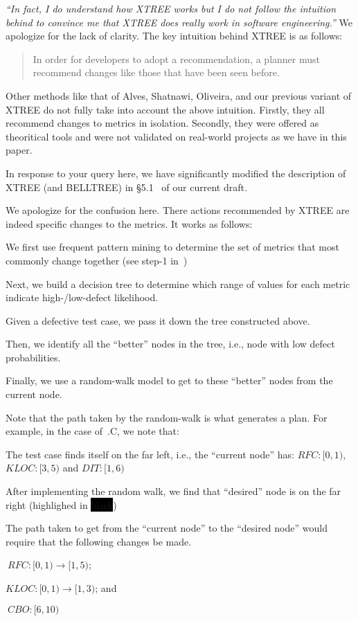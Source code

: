 \item \textit{``In fact, I do understand how XTREE works but I do not follow the intuition behind to convince me that XTREE does really work in software engineering.''} We apologize for the lack of clarity. The key intuition behind XTREE is as follows: 
\begin{quote}
   In order for developers to adopt a recommendation, a planner must recommend changes like those that have been seen before. 
\end{quote}
Other methods like that of Alves, Shatnawi, Oliveira, and our previous variant of XTREE do not fully take into account the above intuition. Firstly, they all recommend changes to metrics in isolation. Secondly, they were offered as theoritical tools and were not validated on real-world projects as we have in this paper.    
\ee

In response to your query here, we have significantly modified the description of XTREE (and BELLTREE) in \S5.1~ of our current draft.


We apologize for the confusion here. There actions recommended by XTREE are indeed specific changes to the metrics. It works as follows:
\be
\item We first use frequent pattern mining to determine the set of metrics that most commonly change together (see step-1 in~)
\item Next, we build a decision tree to determine which range of values for each metric indicate high-/low-defect likelihood. 
\item Given a defective test case, we pass it down the tree constructed above. 
\item Then, we identify all the  ``better'' nodes in the tree, i.e., node with low defect probabilities.
\item Finally, we use a random-walk model to get to these ``better'' nodes from the current node.
\ee

Note that the path taken by the random-walk is what generates a plan. For example, in the case of~.C, we note that:
\be
\item The test case finds itself on the far left, i.e., the ``current node'' has: $RFC: [0, 1)$, $KLOC: [3,5)$ and $DIT: [1,6)$
\item After implementing the random walk, we find that ``desired'' node is on the far right (highlighed in \colorbox{black}{{\color{white} black}})
\item The path taken to get from the ``current node'' to the ``desired node'' would require that the following changes be made.
\bi
\item[$\circ$] $~RFC:  [0, 1) \longrightarrow [1, 5)$;
\item[$\circ$] $KLOC:  [0, 1) \longrightarrow [1, 3)$; and
\item[$\circ$] $~CBO:  [6, 10)$
\ei
\ee

